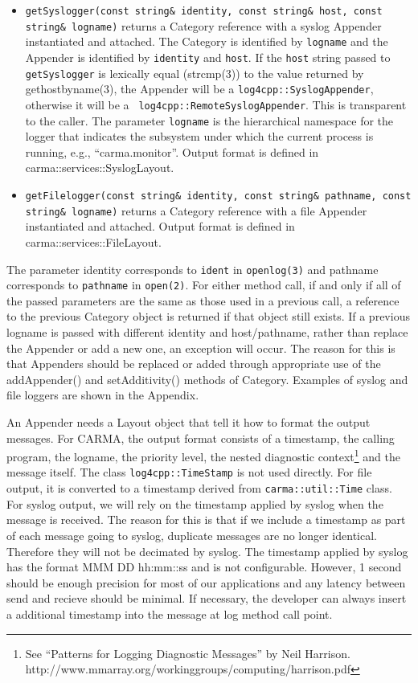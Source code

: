 \documentclass[preprint]{aastex}
\begin{document}
\begin{itemize}

\item {\tt getSyslogger(const string\& identity, const string\&
host, const string\& logname)} returns a Category reference with a
syslog Appender instantiated and attached.  The Category is identified by
{\tt logname} and the Appender is identified by {\tt identity} and {\tt host}.  
If the {\tt host} string passed to {\tt getSyslogger} is lexically equal
(strcmp(3)) to the value returned by gethostbyname(3), the Appender
will be a {\tt log4cpp::SyslogAppender}, otherwise it will be a {\tt
log4cpp::RemoteSyslogAppender}.  This is transparent to the caller.
The parameter {\tt logname} is the hierarchical namespace for the
logger that indicates the subsystem under which the current
process is running, e.g., ``carma.monitor''. 
Output format is defined in carma::services::SyslogLayout.

\item{\tt getFilelogger(const string\& identity, const string\& pathname, const string\& logname)} returns a Category reference with a file Appender
instantiated and attached.  Output format is defined in carma::services::FileLayout.

\end{itemize}

\noindent The parameter identity corresponds to {\tt ident} in {\tt openlog(3)}
and pathname corresponds to {\tt pathname} in {\tt open(2)}.
For either method call, if and only if all of the passed
parameters are the same as those used in a previous call, a reference
to the previous Category object is returned if that object still
exists.  If a previous logname is passed with different identity
and host/pathname, rather than replace the Appender or add a new
one, an exception will occur.  The reason for this is that 
Appenders should be replaced or added
through appropriate use of the addAppender() and setAdditivity()
methods of Category. 
Examples of syslog and file loggers are shown in the Appendix.

An Appender needs a Layout object that tell it how to format the
output messages.  For CARMA, the output format 
consists of a timestamp, the calling program, the logname, the priority level,
the nested diagnostic context\footnote{See ``Patterns for Logging Diagnostic Messages'' by Neil Harrison.\\ 
http://www.mmarray.org/workinggroups/computing/harrison.pdf} 
and the message itself.  The class
{\tt log4cpp::TimeStamp} is not used directly. For file output, 
it is converted to a timestamp derived from {\tt carma::util::Time} class. 
For syslog output, we will rely on the timestamp applied by syslog
when the message is received. The reason for this is that if we
include a timestamp as part of each message going to syslog, 
duplicate messages are no longer identical.  Therefore they will
not be decimated by syslog.  The timestamp applied by syslog has
the format MMM DD hh:mm::ss and is not configurable. However, 1 second
should be enough precision for most of our applications and any latency
between send and recieve should be minimal. If necessary,
the developer can always insert a additional timestamp into the message at
log method call point.  
\end{document}
